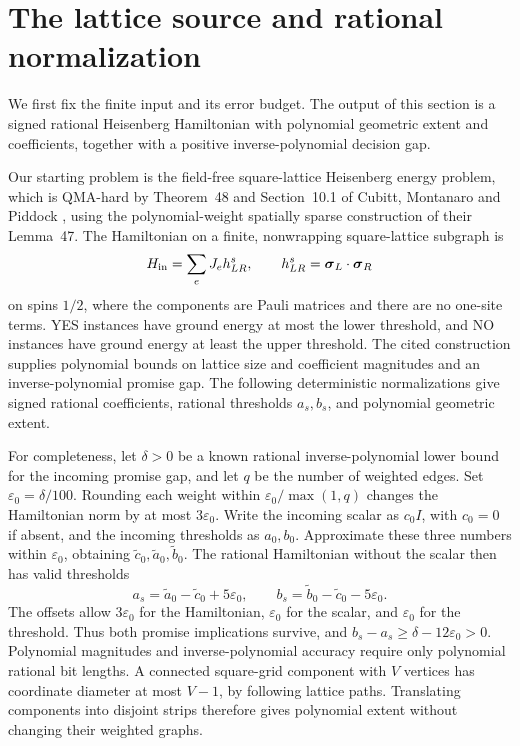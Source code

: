 \section{The lattice source and rational normalization}\label{sec:source}

We first fix the finite input and its error budget. The output of this
section is a signed rational Heisenberg Hamiltonian with polynomial
geometric extent and coefficients, together with a positive
inverse-polynomial decision gap.

Our starting problem is the field-free square-lattice Heisenberg energy
problem, which is QMA-hard by Theorem~48 and Section~10.1 of Cubitt,
Montanaro and Piddock \cite{CMP2019}, using the polynomial-weight
spatially sparse construction of their Lemma~47. The Hamiltonian on a
finite, nonwrapping square-lattice subgraph is
\[
             H_{\rm in}=\sum_e J_e h^s_{LR},\qquad
             h^s_{LR}=\boldsymbol\sigma_L\cdot\boldsymbol\sigma_R
\]
on spins \(1/2\), where the components are Pauli matrices and there are
no one-site terms. YES instances have ground energy at most the lower
threshold, and NO instances have ground energy at least the upper
threshold. The cited construction supplies polynomial bounds on lattice
size and coefficient magnitudes and an inverse-polynomial promise gap.
The following deterministic normalizations give signed rational
coefficients, rational thresholds \(a_s,b_s\), and polynomial geometric
extent.

For completeness, let \(\delta>0\) be a known rational
inverse-polynomial lower bound for the incoming promise gap, and let
\(q\) be the number of weighted edges. Set
\(\varepsilon_0=\delta/100\). Rounding each weight within
\(\varepsilon_0/\max(1,q)\) changes the Hamiltonian norm by at most
\(3\varepsilon_0\). Write the incoming scalar as \(c_0I\), with
\(c_0=0\) if absent, and the incoming thresholds as \(a_0,b_0\).
Approximate these three numbers within \(\varepsilon_0\), obtaining
\(\widetilde c_0,\widetilde a_0,\widetilde b_0\). The rational
Hamiltonian without the scalar then has valid thresholds
\[
 a_s=\widetilde a_0-\widetilde c_0+5\varepsilon_0,\qquad
 b_s=\widetilde b_0-\widetilde c_0-5\varepsilon_0.
\]
The offsets allow \(3\varepsilon_0\) for the Hamiltonian,
\(\varepsilon_0\) for the scalar, and \(\varepsilon_0\) for the
threshold. Thus both promise implications survive, and
\(b_s-a_s\ge\delta-12\varepsilon_0>0\). Polynomial magnitudes and
inverse-polynomial accuracy require only polynomial rational bit lengths.
A connected square-grid component with \(V\) vertices has coordinate
diameter at most \(V-1\), by following lattice paths. Translating
components into disjoint strips therefore gives polynomial extent
without changing their weighted graphs.

